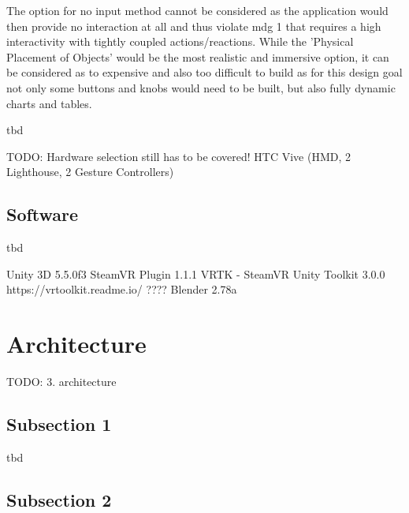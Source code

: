 The option for no input method cannot be considered as the application would then provide no interaction at all and thus violate \gls{mdg} 1 that requires a high interactivity with tightly coupled actions/reactions. While the 'Physical Placement of Objects' would be the most realistic and immersive option, it can be considered as to expensive and also too difficult to build as for this design goal not only some buttons and knobs would need to be built, but also fully dynamic charts and tables.



tbd

TODO: Hardware selection still has to be covered!
HTC Vive (HMD, 2 Lighthouse, 2 Gesture Controllers)



\subsection{Software}

tbd

Unity 3D 5.5.0f3		\cite{Unity2016}
SteamVR Plugin 1.1.1		\cite{Valve2016a}
VRTK - SteamVR Unity Toolkit 3.0.0			\cite{Sysdia2017}
https://vrtoolkit.readme.io/		????
Blender 2.78a		\cite{Blender2016}




\section{Architecture}

TODO:
3. architecture





\subsection{Subsection 1}

tbd



\subsection{Subsection 2}

